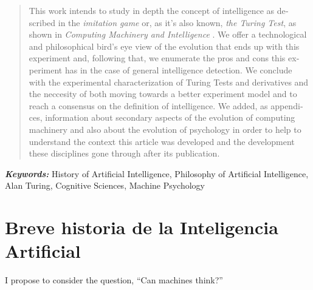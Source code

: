 \documentclass[12pt]{memoir}
\providecommand{\keywords}[2]{
	\textbf{\textit{#1: }} #2
}
\begin{document}
\begin{otherlanguage}{english}
\begin{abstract}
    This work intends to study in depth the concept of intelligence as described in the \textit{imitation game} or, as it's also known, \textit{the Turing Test}, as shown in \textit{Computing Machinery and Intelligence} \parencite{Turing1950cmi}. We offer a technological and philosophical bird's eye view of the evolution that ends up with this experiment and, following that, we enumerate the pros and cons this experiment has in the case of general intelligence detection. We conclude with the experimental characterization of Turing Tests and derivatives and the neccesity of both moving towards a better experiment model and to reach a consensus on the definition of intelligence. We added, as appendices, information about secondary aspects of the evolution of computing machinery and also about the evolution of psychology in order to help to understand the context this article was developed and the development these disciplines gone through after its publication.
\end{abstract}
\end{otherlanguage}

\keywords{Keywords}{History of Artificial Intelligence, Philosophy of Artificial Intelligence, Alan Turing, Cognitive Sciences, Machine Psychology}

\newpage
\thispagestyle{empty}




\DoubleSpacing
\begin{KeepFromToc}
  \tableofcontents
\end{KeepFromToc}
\thispagestyle{empty}
\OnehalfSpacing
\newpage

\pagestyle{fancy}
\fancyhf{}
\cfoot{\thepage}

\chapter{Breve historia de la Inteligencia Artificial}

\epigraph{\flqq I propose to consider the question, ``Can machines think?''\frqq}{\cite{Turing1950cmi}}
\end{document}
